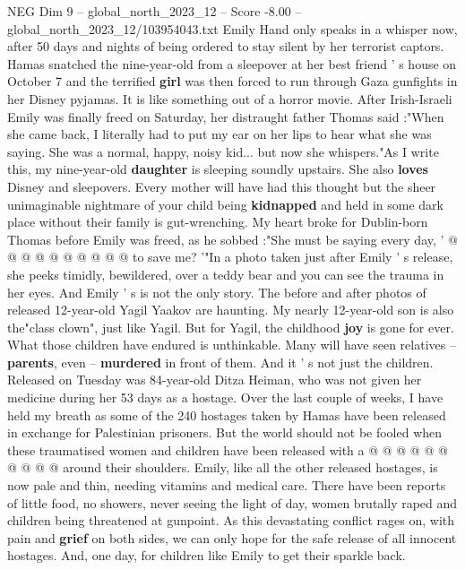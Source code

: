 \begin{textsample}{NEG Dim 9 – global\_north\_2023\_12 – Score -8.00 – global\_north\_2023\_12/103954043.txt}  \label{ex:f9_neg_076}
Emily Hand only speaks in a whisper now, after 50 days and nights of being ordered to stay silent by her terrorist captors.
Hamas snatched the nine-year-old from a sleepover at her best friend ' s house on October 7 and the terrified \textbf{girl} was then forced to run through Gaza gunfights in her Disney pyjamas.
It is like something out of a horror movie.
After Irish-Israeli Emily was finally freed on Saturday, her distraught father Thomas said :"When she came back, I literally had to put my ear on her lips to hear what she was saying.
She was a normal, happy, noisy kid... but now she whispers."As I write this, my nine-year-old \textbf{daughter} is sleeping soundly upstairs.
She also \textbf{loves} Disney and sleepovers.
Every mother will have had this thought but the sheer unimaginable nightmare of your child being \textbf{kidnapped} and held in some dark place without their family is gut-wrenching.
My heart broke for Dublin-born Thomas before Emily was freed, as he sobbed :"She must be saying every day, ' @ @ @ @ @ @ @ @ @ @ to save me? '"In a photo taken just after Emily ' s release, she peeks timidly, bewildered, over a teddy bear and you can see the trauma in her eyes.
And Emily ' s is not the only story.
The before and after photos of released 12-year-old Yagil Yaakov are haunting.
My nearly 12-year-old son is also the"class clown", just like Yagil.
But for Yagil, the childhood \textbf{joy} is gone for ever.
What those children have endured is unthinkable.
Many will have seen relatives -- \textbf{parents}, even -- \textbf{murdered} in front of them.
And it ' s not just the children.
Released on Tuesday was 84-year-old Ditza Heiman, who was not given her medicine during her 53 days as a hostage.
Over the last couple of weeks, I have held my breath as some of the 240 hostages taken by Hamas have been released in exchange for Palestinian prisoners.
But the world should not be fooled when these traumatised women and children have been released with a @ @ @ @ @ @ @ @ @ @ around their shoulders.
Emily, like all the other released hostages, is now pale and thin, needing vitamins and medical care.
There have been reports of little food, no showers, never seeing the light of day, women brutally raped and children being threatened at gunpoint.
As this devastating conflict rages on, with pain and \textbf{grief} on both sides, we can only hope for the safe release of all innocent hostages.
And, one day, for children like Emily to get their sparkle back.

\end{textsample}

